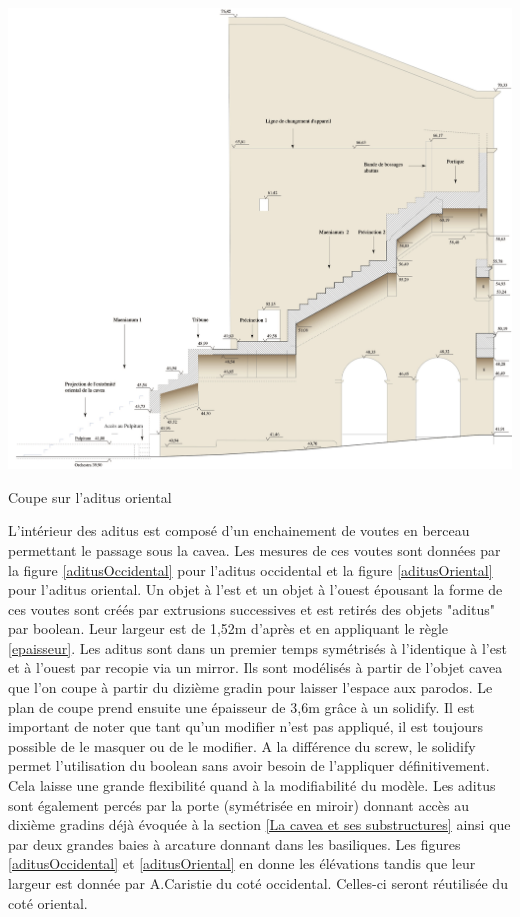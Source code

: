\begin{figureth}
\begin{subfigureth}{0.49\textwidth}
		\includegraphics[width=\linewidth]{images/aditusOriental}
		\caption[Coupe sur l'\gls{aditus} oriental]{Coupe sur l'\gls{aditus} oriental \cite[Pl. XLIX]{orangePl}}
		\label{aditusOriental}
	\end{subfigureth}
	\label{aditus}
\end{figureth}

L'intérieur des aditus est composé d'un enchainement de voutes en berceau permettant le passage sous la cavea. Les mesures de ces voutes sont données par la figure \ref{aditusOccidental} pour l'aditus occidental et la figure \ref{aditusOriental} pour l'aditus oriental. Un objet à l'est et un objet à l'ouest épousant la forme de ces voutes sont créés par extrusions successives et est retirés des objets "aditus" par \gls{boolean}. Leur largeur est de 1,52m d'après \cite[Pl. XXI]{orangePl} et en appliquant le règle \ref{epaisseur}. Les aditus sont dans un premier temps symétrisés à l'identique à l'est et à l'ouest par recopie via un \gls{mirror}. Ils sont modélisés à partir de l'objet cavea que l'on coupe à partir du dizième gradin pour laisser l'espace aux \gls{parodos}. Le plan de coupe prend ensuite une épaisseur de 3,6m grâce à un \gls{solidify}. Il est important de noter que tant qu'un modifier n'est pas appliqué, il est toujours possible de le masquer ou de le modifier. A la différence du \gls{screw}, le \gls{solidify} permet l'utilisation du \gls{boolean} sans avoir besoin de l'appliquer définitivement. Cela laisse une grande flexibilité quand à la modifiabilité du modèle. Les aditus sont également percés par la porte (symétrisée en miroir) donnant accès au dixième gradins déjà évoquée à la section \ref{La cavea et ses substructures} ainsi que par deux grandes baies à arcature donnant dans les basiliques. Les figures \ref{aditusOccidental} et \ref{aditusOriental} en donne les élévations tandis que leur largeur est donnée par A.Caristie du coté occidental. Celles-ci seront réutilisée du coté oriental.

